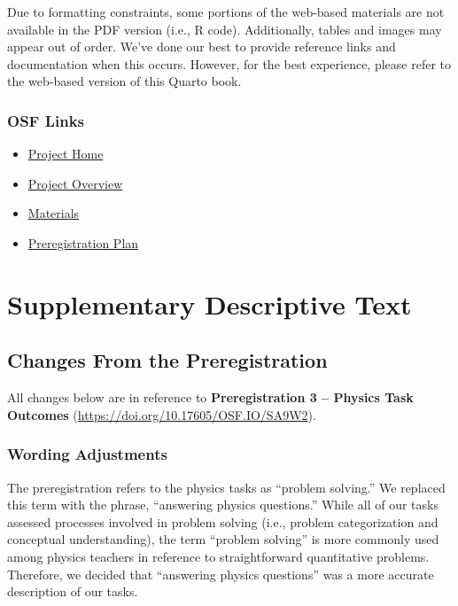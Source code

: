 \documentclass[
  letterpaper,
  DIV=11,
  numbers=noendperiod]{scrreprt}
\providecommand{\tightlist}{%
  \setlength{\itemsep}{0pt}\setlength{\parskip}{0pt}}
\begin{document}

Due to formatting constraints, some portions of the web-based materials
are not available in the PDF version (i.e., R code). Additionally,
tables and images may appear out of order. We've done our best to
provide reference links and documentation when this occurs. However, for
the best experience, please refer to the web-based version of this
Quarto book.

\section*{OSF Links}\label{osf-links}


\begin{itemize}
\tightlist
\item
  \href{https://osf.io/wv6xt/}{Project Home}
\item
  \href{https://doi.org/10.17605/OSF.IO/7RXVC}{Project Overview}
\item
  \href{https://osf.io/fm8qx/}{Materials}
\item
  \href{https://doi.org/10.17605/OSF.IO/SA9W2}{Preregistration Plan}
\end{itemize}

\part{Supplementary Descriptive Text}

\chapter{Changes From the
Preregistration}\label{changes-from-the-preregistration}

All changes below are in reference to \textbf{Preregistration 3 --
Physics Task Outcomes} (\url{https://doi.org/10.17605/OSF.IO/SA9W2}).

\section{Wording Adjustments}\label{wording-adjustments}

The preregistration refers to the physics tasks as ``problem solving.''
We replaced this term with the phrase, ``answering physics questions.''
While all of our tasks assessed processes involved in problem solving
(i.e., problem categorization and conceptual understanding), the term
``problem solving'' is more commonly used among physics teachers in
reference to straightforward quantitative problems. Therefore, we
decided that ``answering physics questions'' was a more accurate
description of our tasks.
\end{document}
